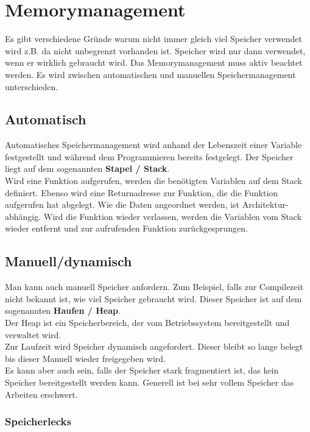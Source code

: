 \section{Memorymanagement}

Es gibt verschiedene Gründe warum nicht immer gleich viel Speicher verwendet wird z.B. da nicht unbegrenzt vorhanden ist.
Speicher wird nur dann verwendet, wenn er wirklich gebraucht wird. 
Das Memorymanagement muss aktiv beachtet werden.
Es wird zwischen automatischen und manuellen Speichermanagement unterschieden. 

\subsection{Automatisch}

Automatisches Speichermanagement wird anhand der Lebenszeit einer Variable festgestellt und während dem Programmieren bereits festgelegt. 
Der Speicher liegt auf dem sogenannten \textbf{Stapel / Stack}.\\
Wird eine Funktion aufgerufen, werden die benötigten Variablen auf dem Stack definiert. 
Ebenso wird eine Returnadresse zur Funktion, die die Funktion aufgerufen hat abgelegt.
Wie die Daten angeordnet werden, ist Architektur-abhängig.
Wird die Funktion wieder verlassen, werden die Variablen vom Stack wieder entfernt und zur aufrufenden Funktion zurückgesprungen.  

\subsection{Manuell/dynamisch}

Man kann auch manuell Speicher anfordern. 
Zum Beispiel, falls zur Compilezeit nicht bekannt ist, wie viel Speicher gebraucht wird.
Dieser Speicher ist auf dem sogenannten \textbf{Haufen / Heap}.\\
Der Heap ist ein Speicherbereich, der vom Betriebssystem bereitgestellt und verwaltet wird.\\
Zur Laufzeit wird Speicher dynamisch angefordert. 
Dieser bleibt so lange belegt bis dieser Manuell wieder freigegeben wird.\\
Es kann aber auch sein, falls der Speicher stark fragmentiert ist, das kein Speicher bereitgestellt werden kann. 
Generell ist bei sehr vollem Speicher das Arbeiten erschwert.

\subsubsection{Speicherlecks}


